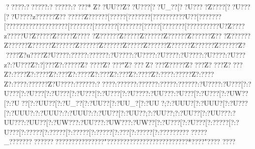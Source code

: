 {{{{{{{{{{{{{{{{{{{{{{{{{{{{{{{{{{{{{{{{{{{{{{{{{{{{{{{{{{{{{{{{{{{{{{{{{{{{{{{{{{{{{{{{{{{{{{{{{{{{{{{{{{{{{{{{{{{{{{{{{{{{{{{{{{{{{{{{{{{{{{{{{{{{{{{{{{{{{{{{{{{{{{{{{{{{{{{{{{{{{{{{{{{{{{{{{{{{{{{{{{{{{{{{{{{{{{{{{{{{{{{{{{{{{{{{{{{{{{{{{{{{{{{{{{{{{{{{{{{{{{{{{{{{{{{{{{{{{{{{{{{{{{{{{{{{{{{{{{{{{{{{{{{{{{{{{{{{{{{{{{{{{{{{{{{{{{{{{{{{{{{{{{{{{{{{{{{{{{{{{{{{{{{{{{{{{{{{{{{{{{{{{{{{{{{{{{{{{{{{{{{{{{{{{{{{{{{{{{{{{{{{{{{{{{{{{{{{{{{{{{{{{{{{{{{{{{{{{{{{{{{{{{{{{{{{{{{{{{{{{{{{{{{{{{{{{{{{{{{{{{{{{{{{{{{{{{{{{{{{{{{{{{{{{{{{{{{{{{{{{{{{{{{{{{{{{{{{{{{{{{{{{{{{{{{{{{{{{{{{{{{{{{{{{{{{{{{{{{{{{{{{{{{{{{{{{{{{{{{{{{{{{{{{{{{{{{{{{{{{{{{{{{{{{{{{{{{{{{{{{{{{{{{{{{{{{{{{{{{{{{{{{{{{{{{{{{{{{{{{{{{{{{{{{{{{{{{{{{{{{{{{{{{{{{{{{{{{{{{{{{{{{{{{{{{{{{{{{{{{{{{{{{{{{{{{{{{{{{{{{{{{{{{{{{{{{{{{{{{{{{{{{{{{{{{{{{{{{{{{{{{{{{{{{{{{{{{{{{{ ????? :??????:??????:????*Z??UU??Z??U???[??U_??[??U????Z? ???[??U???[??U???{?z?????{?Z??  {?{???  {?Z???? ??[?????[???????[?????{?{????U??[???????[?????{?{?????{?{???????[???????[???????[???????[?????[???????[?????{?{????U{?Z???? z?{????U{?Z???? {?Z???? {?Z???? {?Z???? ??Z?????Z?????{?Z?????{?Z?????{?Z??{?Z?????{?Z?????{?Z?????{?Z?????{?Z?????{?Z?????{?Z????{?Z?????{?Z?????{?Z?????{?Z?????{?Z????{?Z?u???{?Z?U???{?:?????:?{? ???{?:?U???{?:?U???{?:?U???{?:?U???{?:?U???{?:?U???z?:?U???Z?:?]???Z?:?????Z????? Z????" Z???? Z????  Z?????  Z????  Z????  Z????  Z?:???? Z?:???? Z?:???  Z?:???? Z?:???  Z?:???Z?:???? Z?:??? {?:?????Z?:???? Z?:???  {?:?????{?Z?U???{?:?????{?:????{?:?????{?:?????{?:?????:?{? ???{?:?U???{?:?U???[?:?U???[?:?U???[?:?U???[?:?U???[?:?U???[?:?U???{?:?UU??{?:?U???[?:?U???[?:?UW??[?:?U??[?:?UU??[?:?U_??[?:?UU??[?:?UU_?[?:?UU?;?:?UUU?[?:?UUU?[?:?U???[?:?UUU?:?:?UUU?:?:?UUU?:?:?UU??[?:?UU??;?:?UU??;?:?UU??[?:?UU??{?:?UU??{?:?UU??[?:?UW??{?:?UU??{?:?UW??{?:?UW??[?:?U???[?:?U???[?:?????[?:?U???[?:?????[?:?????[?:?????[?:?????[?:???[?:?????[?:???????{??????{?_?????{??????{??????{???????{????"??{???  ??{???  ??{???  ??{???????{?*   ??{??"  ??{??   ??{??
}}}}}}}}}}}}}}}}}}}}}}}}}}}}}}}}}}}}}}}}}}}}}}}}}}}}}}}}}}}}}}}}}}}}}}}}}}}}}}}}}}}}}}}}}}}}}}}}}}}}}}}}}}}}}}}}}}}}}}}}}}}}}}}}}}}}}}}}}}}}}}}}}}}}}}}}}}}}}}}}}}}}}}}}}}}}}}}}}}}}}}}}}}}}}}}}}}}}}}}}}}}}}}}}}}}}}}}}}}}}}}}}}}}}}}}}}}}}}}}}}}}}}}}}}}}}}}}}}}}}}}}}}}}}}}}}}}}}}}}}}}}}}}}}}}}}}}}}}}}}}}}}}}}}}}}}}}}}}}}}}}}}}}}}}}}}}}}}}}}}}}}}}}}}}}}}}}}}}}}}}}}}}}}}}}}}}}}}}}}}}}}}}}}}}}}}}}}}}}}}}}}}}}}}}}}}}}}}}}}}}}}}}}}}}}}}}}}}}}}}}}}}}}}}}}}}}}}}}}}}}}}}}}}}}}}}}}}}}}}}}}}}}}}}}}}}}}}}}}}}}}}}}}}}}}}}}}}}}}}}}}}}}}}}}}}}}}}}}}}}}}}}}}}}}}}}}}}}}}}}}}}}}}}}}}}}}}}}}}}}}}}}}}}}}}}}}}}}}}}}}}}}}}}}}}}}}}}}}}}}}}}}}}}}}}}}}}}}}}}}}}}}}}}}}}}}}}}}}}}}}}}}}}}}}}}}}}}}}}}}}}}}}}}}}}}}}}}}}}}}}}}}}}}}}}}}}}}}}}}}}}}}}}}}}}}}}}}}}}}}}}}}}}}}}}}}}}}}}}}}}}}}}}}}}}}}}}}}}}}}}}}}}}}}}}}}}}}}}}}}}}}}}}}}}}}}}}}}}}}}}}}}}}}}}}}}}}}}}}}}}}}}}}}}}}}}}}}}}}}}}}}}}}}}}}}}}}}}}}}}}}}}}}}}}}}}}}}}}}}}}}}}}}}}}}}}}}}
